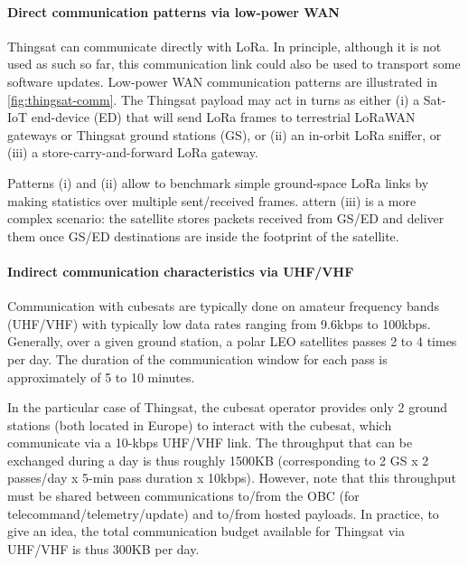 \paragraph*{Direct communication patterns via low-power WAN}
Thingsat can communicate directly with LoRa. %
In principle, although it is not used as such so far, this communication link could also be used to transport some software updates.
Low-power WAN communication patterns are illustrated in \autoref{fig:thingsat-comm}.
The Thingsat payload may act in turns as either 
(i) a Sat-IoT end-device (ED) that will send LoRa frames to terrestrial LoRaWAN gateways or Thingsat ground stations (GS), or 
(ii) an in-orbit LoRa sniffer, or 
(iii) a store-carry-and-forward LoRa gateway.

Patterns (i) and (ii) allow to benchmark simple ground-space LoRa links by
making statistics over multiple sent/received frames. 
attern (iii) is a more
complex scenario: the satellite stores packets received from GS/ED and deliver
them once GS/ED destinations are inside the footprint of the satellite.

\paragraph*{Indirect communication characteristics via UHF/VHF}
Communication with cubesats are typically done on amateur frequency
bands (UHF/VHF) with typically low data rates ranging from 9.6kbps to
100kbps. 
Generally, over a given ground station, a polar LEO satellites passes 2 to 4 times per day. The duration of the communication window for each pass is approximately of 5 to 10 minutes. 

In the particular case of Thingsat, the cubesat operator provides only 2 ground stations (both located in Europe) to interact with the cubesat, which communicate via a 10-kbps UHF/VHF link.
The throughput that can be exchanged during a day is thus roughly 1500KB (corresponding to 2 GS x 2
passes/day x 5-min pass duration x 10kbps).
 However, note that this throughput must be shared between communications to/from the OBC
(for telecommand/telemetry/update) and to/from hosted payloads. 
In practice, to give an
idea, the total communication budget available for Thingsat via UHF/VHF is thus 300KB per day. 

